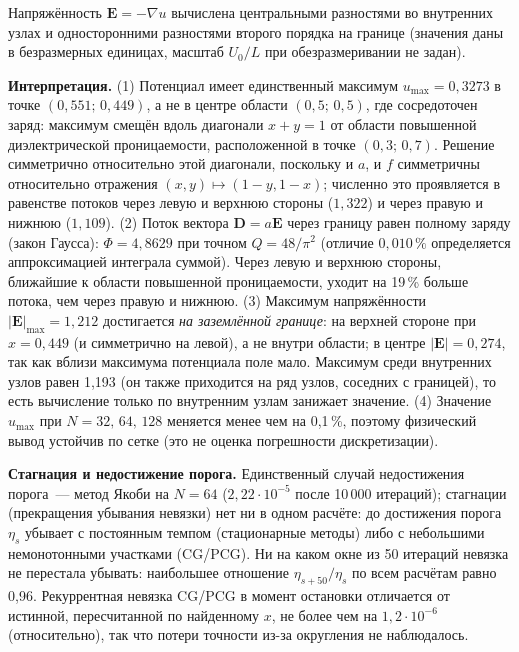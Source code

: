 \documentclass[12pt]{article}
\begin{document}
Напряжённость $\mathbf E=-\nabla u$ вычислена центральными разностями во внутренних узлах и односторонними разностями второго порядка на границе (значения даны в безразмерных единицах, масштаб $U_0/L$ при обезразмеривании не задан).\par

\textbf{Интерпретация.} (1) Потенциал имеет единственный максимум $u_{\max}=0{,}3273$ в точке $(0{,}551;\,0{,}449)$, а не в центре области $(0{,}5;\,0{,}5)$, где сосредоточен заряд: максимум смещён вдоль диагонали $x+y=1$ от области повышенной диэлектрической проницаемости, расположенной в точке $(0{,}3;\,0{,}7)$. Решение симметрично относительно этой диагонали, поскольку и $a$, и $f$ симметричны относительно отражения $(x,y)\mapsto(1-y,1-x)$; численно это проявляется в равенстве потоков через левую и верхнюю стороны ($1{,}322$) и через правую и нижнюю ($1{,}109$). (2) Поток вектора $\mathbf D=a\mathbf E$ через границу равен полному заряду (закон Гаусса): $\Phi=4{,}8629$ при точном $Q=48/\pi^2$ (отличие $0,010\,\%$ определяется аппроксимацией интеграла суммой). Через левую и верхнюю стороны, ближайшие к области повышенной проницаемости, уходит на 19\,\% больше потока, чем через правую и нижнюю. (3) Максимум напряжённости $|\mathbf E|_{\max}=1{,}212$ достигается \emph{на заземлённой границе}: на верхней стороне при $x=0{,}449$ (и симметрично на левой), а не внутри области; в центре $|\mathbf E|=0{,}274$, так как вблизи максимума потенциала поле мало. Максимум среди внутренних узлов равен 1{,}193 (он также приходится на ряд узлов, соседних с границей), то есть вычисление только по внутренним узлам занижает значение. (4) Значение $u_{\max}$ при $N=32,\,64,\,128$ меняется менее чем на 0,1\,\%, поэтому физический вывод устойчив по сетке (это не оценка погрешности дискретизации).\par

\textbf{Стагнация и недостижение порога.} Единственный случай недостижения порога~--- метод Якоби на $N=64$ ($2{,}22\cdot10^{-5}$ после 10\,000 итераций); стагнации (прекращения убывания невязки) нет ни в одном расчёте: до достижения порога $\eta_s$ убывает с постоянным темпом (стационарные методы) либо с небольшими немонотонными участками (CG/PCG). Ни на каком окне из 50 итераций невязка не перестала убывать: наибольшее отношение $\eta_{s+50}/\eta_s$ по всем расчётам равно 0{,}96. Рекуррентная невязка CG/PCG в момент остановки отличается от истинной, пересчитанной по найденному $x$, не более чем на $1{,}2\cdot10^{-6}$ (относительно), так что потери точности из-за округления не наблюдалось.\par
\end{document}
